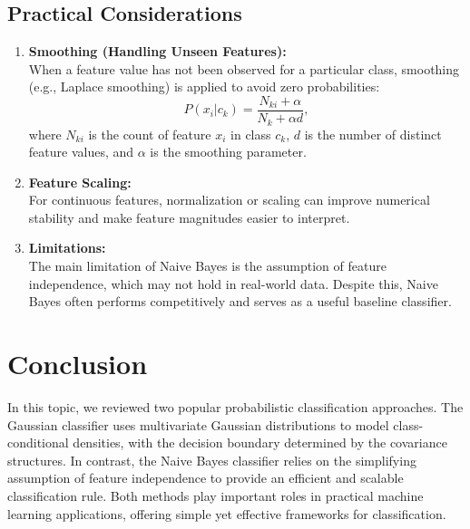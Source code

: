 \documentclass[12pt]{article}
\begin{document}
\subsection{Practical Considerations}
\begin{enumerate}
    \item \textbf{Smoothing (Handling Unseen Features):} \\
    When a feature value has not been observed for a particular class, smoothing (e.g., Laplace smoothing) is applied to avoid zero probabilities:
    $$
    P(x_i|c_k) = \frac{N_{ki} + \alpha}{N_k + \alpha d},
    $$
    where \(N_{ki}\) is the count of feature \(x_i\) in class \(c_k\), \(d\) is the number of distinct feature values, and \(\alpha\) is the smoothing parameter.
    \item \textbf{Feature Scaling:} \\
    For continuous features, normalization or scaling can improve numerical stability and make feature magnitudes easier to interpret.
    \item \textbf{Limitations:} \\
    The main limitation of Naive Bayes is the assumption of feature independence, which may not hold in real-world data. Despite this, Naive Bayes often performs competitively and serves as a useful baseline classifier.
\end{enumerate}

\section{Conclusion}
In this topic, we reviewed two popular probabilistic classification approaches. The Gaussian classifier uses multivariate Gaussian distributions to model class-conditional densities, with the decision boundary determined by the covariance structures. In contrast, the Naive Bayes classifier relies on the simplifying assumption of feature independence to provide an efficient and scalable classification rule. Both methods play important roles in practical machine learning applications, offering simple yet effective frameworks for classification.
\end{document}
